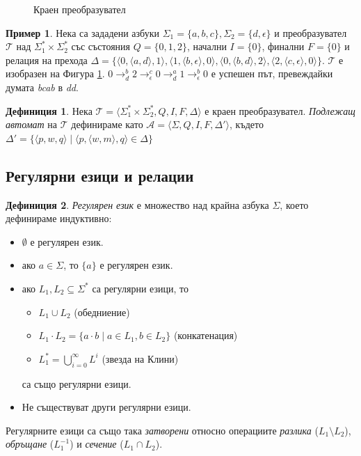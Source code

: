 \documentclass[12pt, oneside]{article}
\theoremstyle{definition}
\newtheorem{definition}{Дефиниция}[section]
\newtheorem{example}{Пример}[section]
\begin{document}
\begin{figure}[!htb]
	\centering
	
	\caption{Краен преобразувател}
	\label{fig:Fst}
\end{figure}

\begin{example}
	Нека са зададени азбуки \( \Sigma_1 = \{ a,b,c \}, \Sigma_2 = \{ d,\epsilon \} \) и преобразувател \( \mathcal{T} \) над \( \Sigma_1^* \times \Sigma_2^*\) със състояния \( Q = \{ 0, 1, 2 \} \), начални \( I = \{ 0 \} \), финални \( F = \{ 0 \} \) и релация на прехода \( \Delta = \{ \langle 0, \langle a, d \rangle, 1 \rangle, \langle 1, \langle b, \epsilon \rangle, 0 \rangle, \langle 0, \langle b, d \rangle, 2 \rangle, \langle 2, \langle c, \epsilon \rangle, 0 \rangle \} \). \newline
	\( \mathcal{T} \) е изобразен на Фигура \ref{fig:Fst}. \newline
	\( 0 \to^{b}_{d} 2 \to^{c}_{\epsilon} 0 \to^{a}_{d} 1 \to^{b}_{\epsilon} 0 \) е успешен път, превеждайки думата \emph{bcab} в \emph{dd}.
\end{example}

\begin{definition}
	Нека \( \mathcal{T} = \langle \Sigma_1^* \times \Sigma_2^*, Q, I, F, \Delta \rangle \) е краен преобразувател. \emph{Подлежащ автомат} на \( \mathcal{T} \) дефинираме като \( \mathcal{A} = \langle \Sigma, Q, I, F, \Delta' \rangle \), където \( \Delta' = \{ \langle p, w, q \rangle \mid \langle p, \langle w, m \rangle, q \rangle \in \Delta \}\)
\end{definition}

\subsection{Регулярни езици и релации}

\begin{definition} 
	\emph{Регулярен език} е множество над крайна азбука \( \Sigma \), което дефинираме индуктивно:
	\begin{itemize}
		\item \( \emptyset \) е регулярен език.
		\item ако \( a \in \Sigma \), то \( \{ a \} \) е регулярен език.
		\item ако \( L_1, L_2 \subseteq \Sigma^* \) са регулярни езици, то 
		\begin{itemize}
			\item \( L_1 \cup L_2 \) (обедниение)
			\item \( L_1 \cdot L_2 = \{ a \cdot b \mid a \in L_1, b \in L_2 \} \) (конкатенация)
			\item \( L_1^* = \bigcup_{i=0}^{\infty}L^i \) (звезда на Клини)
		\end{itemize}
		 са също регулярни езици.
		\item Не съществуват други регулярни езици.
	\end{itemize}
	Регулярните езици са също така \emph{затворени} относно операциите \emph{разлика} (\( L_1 \setminus L_2 \)), \emph{обръщане} (\( L_1^{-1} \)) и \emph{сечение} (\( L_1 \cap L_2 \)).
\end{definition}
\end{document}
